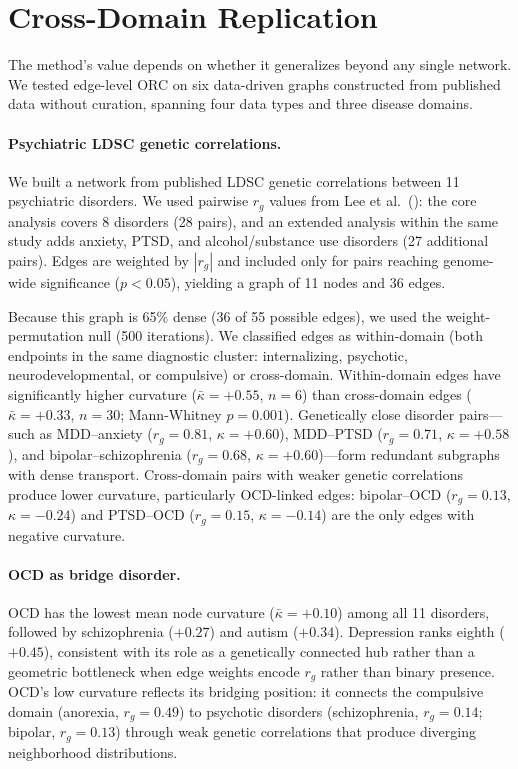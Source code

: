 \documentclass[11pt]{article}
\begin{document}
\section{Cross-Domain Replication}
\label{sec:replication}
\label{sec:ldsc}

The method's value depends on whether it generalizes beyond any single network. We tested edge-level ORC on six data-driven graphs constructed from published data without curation, spanning four data types and three disease domains.

\paragraph{Psychiatric LDSC genetic correlations.} We built a network from published LDSC genetic correlations \citep{buliksullivan2015ld} between 11 psychiatric disorders. We used pairwise $r_g$ values from Lee et al.\ (\citeyear{lee2022genetic}): the core analysis covers 8 disorders (28 pairs), and an extended analysis within the same study adds anxiety, PTSD, and alcohol/substance use disorders (27 additional pairs). Edges are weighted by $|r_g|$ and included only for pairs reaching genome-wide significance ($p < 0.05$), yielding a graph of 11 nodes and 36 edges.

Because this graph is 65\% dense (36 of 55 possible edges), we used the weight-permutation null (500 iterations). We classified edges as within-domain (both endpoints in the same diagnostic cluster: internalizing, psychotic, neurodevelopmental, or compulsive) or cross-domain. Within-domain edges have significantly higher curvature ($\bar{\kappa} = +0.55$, $n = 6$) than cross-domain edges ($\bar{\kappa} = +0.33$, $n = 30$; Mann-Whitney $p = 0.001$). Genetically close disorder pairs---such as MDD--anxiety ($r_g = 0.81$, $\kappa = +0.60$), MDD--PTSD ($r_g = 0.71$, $\kappa = +0.58$), and bipolar--schizophrenia ($r_g = 0.68$, $\kappa = +0.60$)---form redundant subgraphs with dense transport. Cross-domain pairs with weaker genetic correlations produce lower curvature, particularly OCD-linked edges: bipolar--OCD ($r_g = 0.13$, $\kappa = -0.24$) and PTSD--OCD ($r_g = 0.15$, $\kappa = -0.14$) are the only edges with negative curvature.

\paragraph{OCD as bridge disorder.} OCD has the lowest mean node curvature ($\bar{\kappa} = +0.10$) among all 11 disorders, followed by schizophrenia ($+0.27$) and autism ($+0.34$). Depression ranks eighth ($+0.45$), consistent with its role as a genetically connected hub rather than a geometric bottleneck when edge weights encode $r_g$ rather than binary presence. OCD's low curvature reflects its bridging position: it connects the compulsive domain (anorexia, $r_g = 0.49$) to psychotic disorders (schizophrenia, $r_g = 0.14$; bipolar, $r_g = 0.13$) through weak genetic correlations that produce diverging neighborhood distributions.
\end{document}
